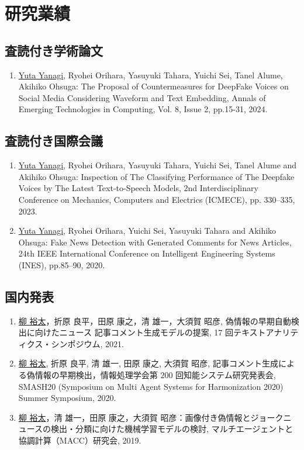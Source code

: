\chapter*{研究業績}
\section{査読付き学術論文}
\begin{enumerate}
    \item \underline{Yuta Yanagi}, Ryohei Orihara, Yasuyuki Tahara, Yuichi Sei, Tanel Alume, Akihiko Ohsuga: The Proposal of Countermeasures for DeepFake Voices on Social Media Considering Waveform and Text Embedding, Annals of Emerging Technologies in Computing, Vol. 8, Issue 2, pp.15-31, 2024.
\end{enumerate}

\section{査読付き国際会議}
\begin{enumerate}
    \item \underline{Yuta Yanagi}, Ryohei Orihara, Yasuyuki Tahara, Yuichi Sei, Tanel Alume and Akihiko Ohsuga: Inspection of The Classifying Performance of The Deepfake Voices by The Latest Text-to-Speech Models, 2nd Interdisciplinary Conference on Mechanics, Computers and Electrics (ICMECE), pp. 330–335, 2023.
    \item \underline{Yuta Yanagi}, Ryohei Orihara, Yuichi Sei, Yasuyuki Tahara and Akihiko Ohsuga: Fake News Detection with Generated Comments for News Articles, 24th IEEE International Conference on Intelligent Engineering Systems (INES), pp.85–90, 2020.
\end{enumerate}

\section{国内発表}
\begin{enumerate}
    \item \underline{柳 裕太}，折原 良平，田原 康之，清 雄一，大須賀 昭彦, 偽情報の早期自動検出に向けたニュース 記事コメント生成モデルの提案, 17 回テキストアナリティクス・シンポジウム, 2021.
    \item \underline{柳 裕太}, 折原 良平, 清 雄一, 田原 康之, 大須賀 昭彦, 記事コメント生成による偽情報の早期検出，情報処理学会第 200 回知能システム研究発表会, SMASH20 (Symposium on Multi Agent Systems for Harmonization 2020) Summer Symposium, 2020.
    \item \underline{柳 裕太}，清 雄一，田原 康之，大須賀 昭彦：画像付き偽情報とジョークニュースの検出・分類に向けた機械学習モデルの検討, マルチエージェントと協調計算（MACC）研究会, 2019. 
\end{enumerate}
